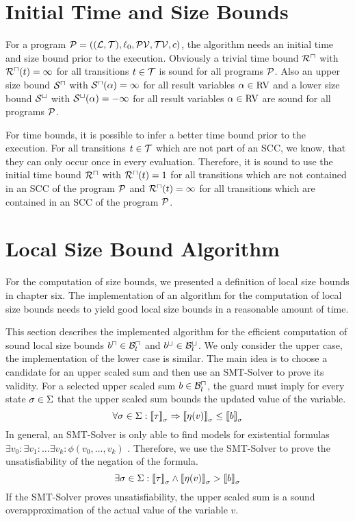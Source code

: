 \section{Initial Time and Size Bounds}

For a program $\mathcal{P} = ((\mathcal{L}, \mathcal{T}), \ell_0, \mathcal{PV}, \mathcal{TV}, c)$, the algorithm needs an initial time and size bound prior to the execution.
Obviously a trivial time bound ${\mathcal{R}^\sqcap}$ with ${\mathcal{R}^\sqcap}(t) = \infty$ for all transitions $t \in \mathcal{T}$ is sound for all programs $\mathcal{P}$.
Also an upper size bound ${\mathcal{S}^\sqcap}$ with ${\mathcal{S}^\sqcap}(\alpha) = \infty$ for all result variables $\alpha \in \text{RV}$ and a lower size bound ${\mathcal{S}^\sqcup}$ with ${\mathcal{S}^\sqcup}(\alpha) = -\infty$ for all result variables $\alpha \in \text{RV}$ are sound for all programs $\mathcal{P}$.

For time bounds, it is possible to infer a better time bound prior to the execution.
For all transitions $t \in \mathcal{T}$ which are not part of an SCC, we know, that they can only occur once in every evaluation.
Therefore, it is sound to use the initial time bound ${\mathcal{R}^\sqcap}$ with ${\mathcal{R}^\sqcap}(t) = 1$ for all transitions which are not contained in an SCC of the program $\mathcal{P}$ and ${\mathcal{R}^\sqcap}(t) = \infty$ for all transitions which are contained in an SCC of the program $\mathcal{P}$.

\section{Local Size Bound Algorithm}

For the computation of size bounds, we presented a definition of local size bounds in chapter six.
The implementation of an algorithm for the computation of local size bounds needs to yield good local size bounds in a reasonable amount of time.

This section describes the implemented algorithm for the efficient computation of sound local size bounds $b^\sqcap \in \mathcal{B}^\sqcap_l$ and $b^\sqcup \in \mathcal{B}^\sqcup_l$.
We only consider the upper case, the implementation of the lower case is similar.
The main idea is to choose a candidate for an upper scaled sum and then use an SMT-Solver to prove its validity.
For a selected upper scaled sum $b \in \mathcal{B}^\sqcap_l$, the guard must imply for every state $\sigma \in \Sigma$ that the upper scaled sum bounds the updated value of the variable.
\[ \forall \sigma \in \Sigma: \left\llbracket \tau \right\rrbracket_{\sigma} \Rightarrow \left\llbracket \eta(v) \right\rrbracket_{\sigma} \leq \left\llbracket b \right\rrbracket_{\sigma} \]
In general, an SMT-Solver is only able to find models for existential formulas $\exists v_0: \exists v_1: \dots \exists v_k: \phi(v_0, \dots, v_k)$ \cite{smt}.
Therefore, we use the SMT-Solver to prove the unsatisfiability of the negation of the formula.
\[ \exists \sigma \in \Sigma: \left\llbracket \tau \right\rrbracket_{\sigma} \wedge \left\llbracket \eta(v) \right\rrbracket_{\sigma} > \left\llbracket b \right\rrbracket_{\sigma} \]
If the SMT-Solver proves unsatisfiability, the upper scaled sum is a sound overapproximation of the actual value of the variable $v$.

